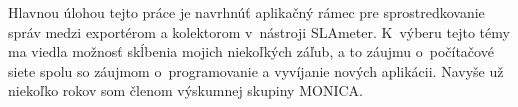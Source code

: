\documentclass[]{tukediphc}
\begin{document}
Hlavnou úlohou tejto práce je navrhnúť aplikačný rámec pre sprostredkovanie správ medzi exportérom a kolektorom
v~nástroji SLAmeter. K~výberu tejto témy ma viedla možnosť skĺbenia mojich niekoľkých záľub, a to 
záujmu o~počítačové siete spolu so záujmom o~programovanie a vyvíjanie nových aplikácii. Navyše už niekoľko 
rokov som členom výskumnej skupiny MONICA.


\kpredhovoru

\pagestyle{empty}
\tableofcontents
\newpage

\pagestyle{empty}
\listoffigures
\newpage

\pagestyle{empty}
\listoftables
\newpage

\pagestyle{empty}
\printglossary %
\newpage

\slovnikterminov
\end{document}
